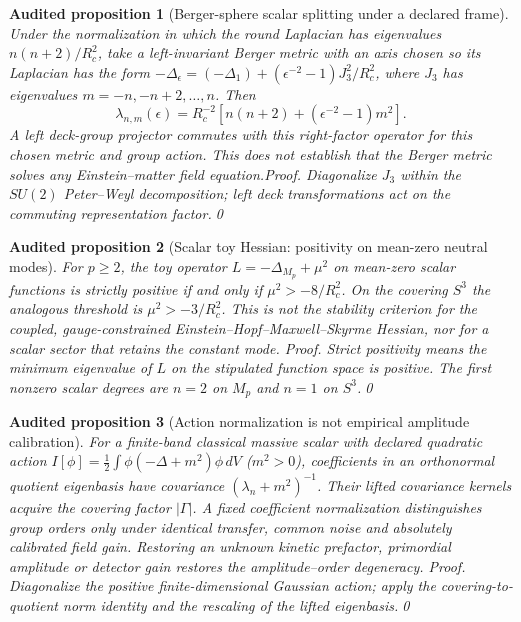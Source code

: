 \documentclass[aps,prd,onecolumn,notitlepage,groupedaddress,11pt]{revtex4-2}
\newtheorem{auditprop}{Audited proposition}[section]
\begin{document}
\begin{auditprop}[Berger-sphere scalar splitting under a declared frame]\label{audit:berger}
Under the normalization in which the round Laplacian has eigenvalues $n(n+2)/R_c^2$, take a left-invariant Berger metric with an axis chosen so its Laplacian has the form $-\Delta_\epsilon=(-\Delta_1)+(\epsilon^{-2}-1)J_3^2/R_c^2$, where $J_3$ has eigenvalues $m=-n,-n+2,\ldots,n$. Then
\begin{equation}\label{audit:bergerformula}
\lambda_{n,m}(\epsilon)=R_c^{-2}[n(n+2)+(\epsilon^{-2}-1)m^2].
\end{equation}
A \emph{left} deck-group projector commutes with this \emph{right-factor} operator for this chosen metric and group action. This does not establish that the Berger metric solves any Einstein--matter field equation.\emph{Proof.} Diagonalize $J_3$ within the $SU(2)$ Peter--Weyl decomposition; left deck transformations act on the commuting representation factor.\qed
\end{auditprop}

\begin{auditprop}[Scalar toy Hessian: positivity on mean-zero neutral modes]\label{audit:threshold}
For $p\ge2$, the toy operator $L=-\Delta_{M_p}+\mu^2$ on \emph{mean-zero} scalar functions is strictly positive if and only if $\mu^2>-8/R_c^2$. On the covering $S^3$ the analogous threshold is $\mu^2>-3/R_c^2$. This is not the stability criterion for the coupled, gauge-constrained Einstein--Hopf--Maxwell--Skyrme Hessian, nor for a scalar sector that retains the constant mode. \emph{Proof.} Strict positivity means the minimum eigenvalue of $L$ on the stipulated function space is positive. The first nonzero scalar degrees are $n=2$ on $M_p$ and $n=1$ on $S^3$.\qed
\end{auditprop}

\begin{auditprop}[Action normalization is not empirical amplitude calibration]\label{audit:normalization}
For a \emph{finite-band classical} massive scalar with declared quadratic action $I[\phi]=\frac{1}{2}\int\phi(-\Delta+m^2)\phi\,dV$ ($m^2>0$), coefficients in an orthonormal quotient eigenbasis have covariance $(\lambda_n+m^2)^{-1}$. Their lifted covariance kernels acquire the covering factor $|\Gamma|$. A fixed coefficient normalization distinguishes group orders only under identical transfer, common noise and absolutely calibrated field gain. Restoring an unknown kinetic prefactor, primordial amplitude or detector gain restores the amplitude--order degeneracy. \emph{Proof.} Diagonalize the positive finite-dimensional Gaussian action; apply the covering-to-quotient norm identity and the rescaling of the lifted eigenbasis.\qed
\end{auditprop}
\end{document}
